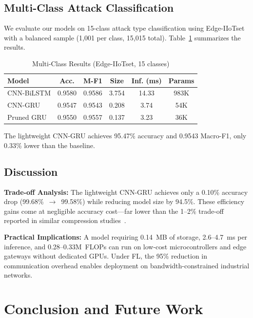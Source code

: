 \documentclass[10pt,journal]{IEEEtran}
\begin{document}
\subsection{Multi-Class Attack Classification}
\label{sec:multiclass}

We evaluate our models on 15-class attack type classification using Edge-IIoTset with a balanced sample (1,001 per class, 15,015 total). Table~\ref{tab:multiclass} summarizes the results.

\begin{table}[t]
\centering\footnotesize
\caption{Multi-Class Results (Edge-IIoTset, 15 classes)}
\label{tab:multiclass}
\begin{tabular}{lccccc}
\toprule
Model & Acc. & M-F1 & Size & Inf. (ms) & Params \\
\midrule
CNN-BiLSTM & 0.9580 & 0.9586 & 3.754 & 14.33 & 983K \\
CNN-GRU & 0.9547 & 0.9543 & 0.208 & 3.74 & 54K \\
Pruned GRU & 0.9550 & 0.9557 & 0.137 & 3.23 & 36K \\
\bottomrule
\end{tabular}
\end{table}

The lightweight CNN-GRU achieves 95.47\% accuracy and 0.9543 Macro-F1, only 0.33\% lower than the baseline.

\subsection{Discussion}

\textbf{Trade-off Analysis:} The lightweight CNN-GRU achieves only a 0.10\% accuracy drop (99.68\%~$\rightarrow$~99.58\%) while reducing model size by 94.5\%. These efficiency gains come at negligible accuracy cost---far lower than the 1--2\% trade-off reported in similar compression studies~\cite{anwer2025advanced,pecherle2026federated}.

\textbf{Practical Implications:} A model requiring 0.14~MB of storage, 2.6--4.7~ms per inference, and 0.28--0.33M~FLOPs can run on low-cost microcontrollers and edge gateways without dedicated GPUs. Under FL, the 95\% reduction in communication overhead enables deployment on bandwidth-constrained industrial networks.

\section{Conclusion and Future Work}
\label{sec:conclusion}
\end{document}
